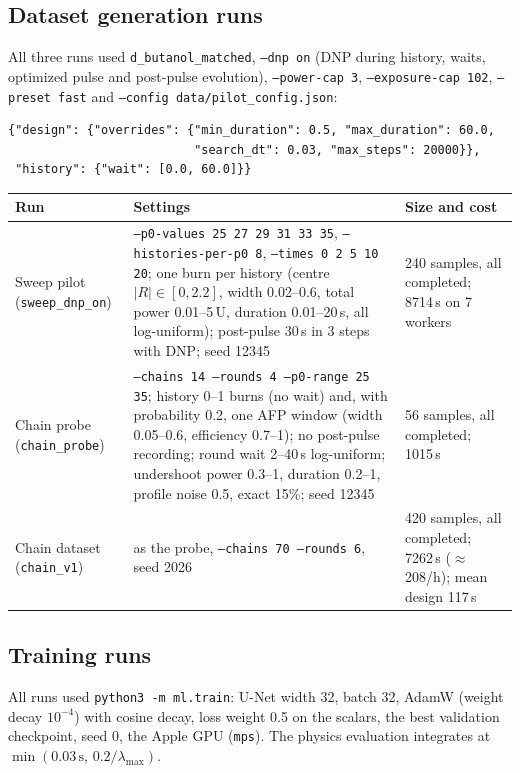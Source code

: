 \documentclass[11pt]{article}
\newcommand{\code}[1]{\texttt{#1}}
\begin{document}
\subsection{Dataset generation runs}

All three runs used \code{d\_butanol\_matched}, \code{--dnp on} (DNP during history, waits,
optimized pulse and post-pulse evolution), \code{--power-cap 3}, \code{--exposure-cap 102},
\code{--preset fast} and \code{--config data/pilot\_config.json}:
\begin{lstlisting}
{"design": {"overrides": {"min_duration": 0.5, "max_duration": 60.0,
                          "search_dt": 0.03, "max_steps": 20000}},
 "history": {"wait": [0.0, 60.0]}}
\end{lstlisting}

\begin{longtable}{L{0.17\textwidth} L{0.52\textwidth} L{0.23\textwidth}}
\toprule
Run & Settings & Size and cost\\
\midrule
Sweep pilot (\code{sweep\_dnp\_on}) & \code{--p0-values 25 27 29 31 33 35}, \code{--histories-per-p0 8}, \code{--times 0 2 5 10 20}; one burn per history (centre \(|R|\in[0,2.2]\), width 0.02--0.6, total power 0.01--5\,U, duration 0.01--20\,s, all log-uniform); post-pulse 30\,s in 3 steps with DNP; seed 12345 & 240 samples, all completed; 8714\,s on 7 workers\\
Chain probe (\code{chain\_probe}) & \code{--chains 14 --rounds 4 --p0-range 25 35}; history 0--1 burns (no wait) and, with probability 0.2, one AFP window (width 0.05--0.6, efficiency 0.7--1); no post-pulse recording; round wait 2--40\,s log-uniform; undershoot power 0.3--1, duration 0.2--1, profile noise 0.5, exact 15\%; seed 12345 & 56 samples, all completed; 1015\,s\\
Chain dataset (\code{chain\_v1}) & as the probe, \code{--chains 70 --rounds 6}, seed 2026 & 420 samples, all completed; 7262\,s (\(\approx\)208/h); mean design 117\,s\\
\bottomrule
\end{longtable}

\subsection{Training runs}

All runs used \code{python3 -m ml.train}: U-Net width 32, batch 32, AdamW (weight decay
\(10^{-4}\)) with cosine decay, loss weight 0.5 on the scalars, the best validation checkpoint,
seed 0, the Apple GPU (\code{mps}). The physics evaluation integrates at \(\min(0.03\,\mathrm{s},\,0.2/\lambda_{\max})\).
\end{document}
